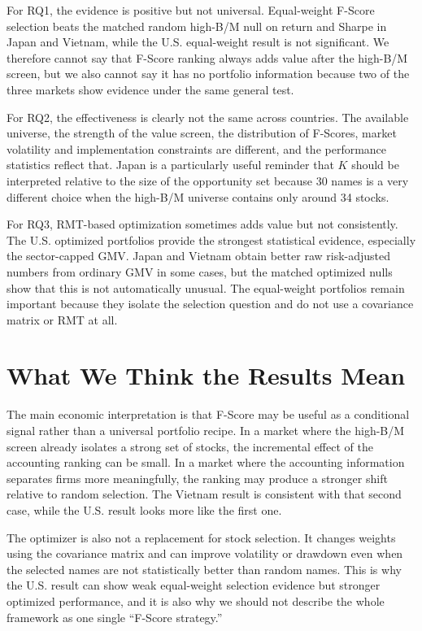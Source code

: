 \documentclass[11pt,a4paper]{report}
\numberwithin{figure}{chapter}
\numberwithin{table}{chapter}
\numberwithin{equation}{chapter}
\begin{document}
For RQ1, the evidence is positive but not universal. Equal-weight F-Score selection beats the matched random high-B/M null on return and Sharpe in Japan and Vietnam, while the U.S. equal-weight result is not significant. We therefore cannot say that F-Score ranking always adds value after the high-B/M screen, but we also cannot say it has no portfolio information because two of the three markets show evidence under the same general test.

For RQ2, the effectiveness is clearly not the same across countries. The available universe, the strength of the value screen, the distribution of F-Scores, market volatility and implementation constraints are different, and the performance statistics reflect that. Japan is a particularly useful reminder that $K$ should be interpreted relative to the size of the opportunity set because 30 names is a very different choice when the high-B/M universe contains only around 34 stocks.

For RQ3, RMT-based optimization sometimes adds value but not consistently. The U.S. optimized portfolios provide the strongest statistical evidence, especially the sector-capped GMV. Japan and Vietnam obtain better raw risk-adjusted numbers from ordinary GMV in some cases, but the matched optimized nulls show that this is not automatically unusual. The equal-weight portfolios remain important because they isolate the selection question and do not use a covariance matrix or RMT at all.

\section{What We Think the Results Mean}

The main economic interpretation is that F-Score may be useful as a conditional signal rather than a universal portfolio recipe. In a market where the high-B/M screen already isolates a strong set of stocks, the incremental effect of the accounting ranking can be small. In a market where the accounting information separates firms more meaningfully, the ranking may produce a stronger shift relative to random selection. The Vietnam result is consistent with that second case, while the U.S. result looks more like the first one.

The optimizer is also not a replacement for stock selection. It changes weights using the covariance matrix and can improve volatility or drawdown even when the selected names are not statistically better than random names. This is why the U.S. result can show weak equal-weight selection evidence but stronger optimized performance, and it is also why we should not describe the whole framework as one single ``F-Score strategy.''
\end{document}
